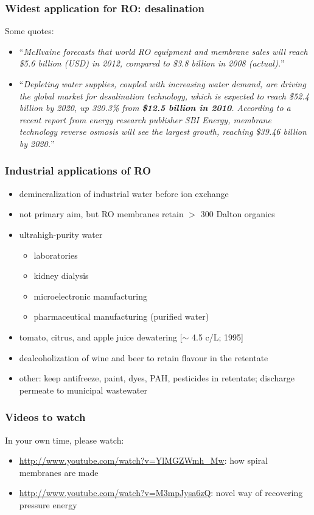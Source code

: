 \begin{frame}\frametitle{Widest application for RO: desalination}
	Some quotes:
	\begin{itemize}
		\item	``\emph{McIlvaine forecasts that world RO equipment and membrane sales will reach \$5.6 billion (USD) in 2012, compared to \$3.8 billion in 2008 (actual).}''
		\item	``\emph{Depleting water supplies, coupled with increasing water demand, are driving the global market for desalination technology, which is expected to reach \$52.4 billion by 2020, up 320.3\% from \textbf{\$12.5 billion in 2010}. According to a recent report from energy research publisher SBI Energy, membrane technology reverse osmosis will see the largest growth, reaching \$39.46 billion by 2020.}''
	\end{itemize}
\end{frame}

\begin{frame}\frametitle{Industrial applications of RO}
	\begin{itemize}
		\item	demineralization of industrial water before ion exchange
		\item	not primary aim, but RO membranes retain $>$ 300 Dalton organics %
		\item	ultrahigh-purity water
		 	\begin{itemize}
		 		\item	laboratories
		 		\item	kidney dialysis
		 		\item	microelectronic manufacturing
		 		\item	pharmaceutical manufacturing (purified water)
		 	\end{itemize}
		 \item	tomato, citrus, and apple juice dewatering [$\sim$ 4.5 c/L; 1995]
		 \item	dealcoholization of wine and beer to retain flavour in the retentate
		 \item	other: keep antifreeze, paint, dyes, PAH, pesticides in retentate; discharge permeate to municipal wastewater
	\end{itemize}
\end{frame}

\begin{frame}\frametitle{Videos to watch}
	In your own time, please watch:

	\begin{itemize}
		\item	\href{http://www.youtube.com/watch?v=YlMGZWmh\_Mw}{http://www.youtube.com/watch?v=YlMGZWmh\_Mw}: how spiral membranes are made
		\item	\href{http://www.youtube.com/watch?v=M3mpJysa6zQ}{http://www.youtube.com/watch?v=M3mpJysa6zQ}: novel way of recovering pressure energy
	\end{itemize}
\end{frame}

